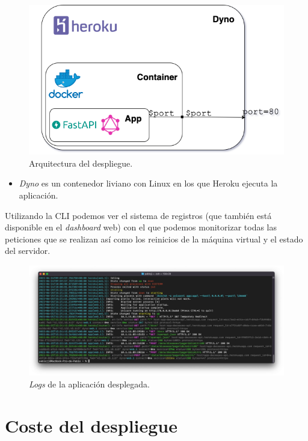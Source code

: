 \FloatBarrier
\begin{figure}[h]
	\centering	
	\includegraphics[width=\textwidth]{doc/logos/imgs/deployd.png}
	\caption{ Arquitectura del despliegue. }
    \label{fig:arq-deploy}
\end{figure}
\FloatBarrier

\begin{itemize}
    \item \textit{Dyno} es un contenedor liviano con Linux en los que Heroku ejecuta la
    aplicación.
\end{itemize}

Utilizando la CLI podemos ver el sistema de registros (que también está disponible en el
\textit{dashboard} web) con el que podemos monitorizar todas las peticiones que se
realizan así como los reinicios de la máquina virtual y el estado del servidor.

\FloatBarrier
\begin{figure}[h]
	\centering	
	\includegraphics[width=\textwidth]{doc/logos/imgs/logs.jpg}
	\caption{ \textit{Logs} de la aplicación desplegada. }
    \label{fig:heroku-logs}
\end{figure}
\FloatBarrier

\section{Coste del despliegue}
\label{sec:despliegue}

